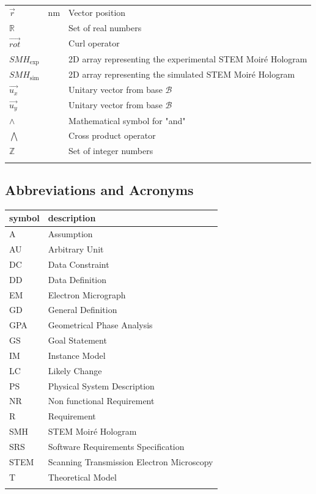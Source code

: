 \documentclass[12pt]{article}
\begin{document}
\begin{longtable*}{l l p{12cm}}
$\vec{r}$ & \si{\nano\meter} & Vector position \\
$\mathbb{R}$ & & Set of real numbers \\
$\overrightarrow{\mathit{rot}}$ & & Curl operator\\
$\mathit{SMH}_{\text{exp}}$ & & 2D array representing the experimental STEM Moir{\'e} Hologram \\
$\mathit{SMH}_{\text{sim}}$ & & 2D array representing the simulated STEM Moir{\'e} Hologram \\
$\vec{u_x}$ & & Unitary vector from base $\mathcal{B}$ \\
$\vec{u_y}$ & & Unitary vector from base $\mathcal{B}$ \\
$\wedge$ & & Mathematical symbol for "and"\\
$\bigwedge$ & & Cross product operator\\
$\mathbb{Z}$ & & Set of integer numbers\\
\bottomrule
\label{table_symbols_SRS}
\end{longtable*}

\subsection{Abbreviations and Acronyms}

\renewcommand{\arraystretch}{1.2}
\begin{tabular}{l l} 
  \toprule		
  \textbf{symbol} & \textbf{description}\\
  \midrule 
  A & Assumption\\
  AU & Arbitrary Unit\\
  DC & Data Constraint \\
  DD & Data Definition\\
  EM & Electron Micrograph \\
  GD & General Definition\\
  GPA & Geometrical Phase Analysis \\
  GS & Goal Statement\\
  IM & Instance Model\\
  LC & Likely Change\\
  PS & Physical System Description\\
  NR & Non functional Requirement\\
  R & Requirement\\
  SMH & STEM Moir{\'e} Hologram \\
  SRS & Software Requirements Specification\\
  STEM & Scanning Transmission Electron Microscopy \\
  T & Theoretical Model\\
  \bottomrule
  \label{table_acro_SRS}
\end{tabular}
\end{document}

